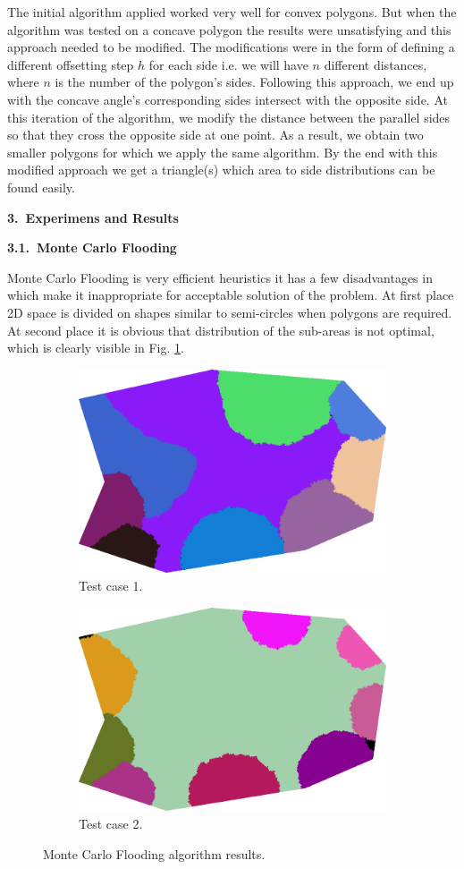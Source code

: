 \documentclass[11pt,leqno]{book}
\newcommand{\sect}[1]{\vskip7mm\par{\large \bf #1}}
\newcommand{\subsect}[1]{\vskip 3mm\par{\bf#1}}
\begin{document}
The initial algorithm applied worked very well for convex polygons. But when the algorithm was tested on a concave polygon the results were unsatisfying and this approach needed to be modified. The modifications were in the form of defining a different offsetting step $h$ for each side i.e. we will have $n$ different distances, where $n$ is the number of the polygon's sides. Following this approach, we end up with the concave angle's corresponding sides intersect with the opposite side. At this iteration of the algorithm, we modify the distance between the parallel sides so that they cross the opposite side at one point. As a result, we obtain two smaller polygons for which we apply the same algorithm. By the end with this modified approach we get a triangle(s) which area to side distributions can be found easily.

\sect{3.~Experimens and Results}

\subsect{3.1.~Monte Carlo Flooding}

Monte Carlo Flooding is very efficient heuristics it has a few disadvantages in which make it inappropriate for acceptable solution of the problem. At first place 2D space is divided on shapes similar to semi-circles when polygons are required. At second place it is obvious that distribution of the sub-areas is not optimal, which is clearly visible in Fig. \ref{fig:sub7}. 

\begin{figure}[h!]
\centering
\begin{subfigure}{.5\textwidth}
  \centering
  \includegraphics[width=.5\linewidth]{pic08.png}
  \caption{Test case 1.}
  \label{fig:sub7}
\end{subfigure}
\begin{subfigure}{.5\textwidth}
  \centering
  \includegraphics[width=.5\linewidth]{pic09.png}
  \caption{Test case 2.}
  \label{fig:sub8}
\end{subfigure}
\caption{Monte Carlo Flooding algorithm results.}
\label{fig:five}
\end{figure}
\FloatBarrier
\end{document}
